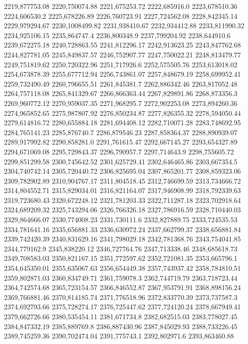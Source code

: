 2219,877753.08
2220,750074.88
2221,675253.72
2222,685916.0
2223,678510.36
2224,606530.2
2225,678226.89
2226,760723.91
2227,724562.08
2228,842345.14
2229,979294.67
2230,1008499.82
2231,938410.67
2232,934412.88
2233,811990.32
2234,925106.15
2235,864747.4
2236,800348.9
2237,799204.92
2238,644910.6
2239,672275.18
2240,728863.55
2241,812296.17
2242,913623.25
2243,847762.68
2244,827781.05
2245,849837.57
2246,752907.77
2247,750022.21
2248,813479.77
2249,751819.62
2250,720322.96
2251,717926.6
2252,575505.76
2253,613018.02
2254,673878.39
2255,677712.94
2256,743861.07
2257,848679.19
2258,699952.41
2259,732490.49
2260,796655.51
2261,845381.7
2262,886342.46
2263,817052.48
2264,757118.08
2265,841329.67
2266,866363.44
2267,829891.86
2268,873356.3
2269,960772.12
2270,959037.35
2271,968295.7
2272,902253.08
2273,894260.36
2274,965852.65
2275,987807.92
2276,850234.87
2277,826355.32
2278,594050.44
2279,614816.72
2280,655884.18
2281,694408.12
2282,710071.28
2283,748692.95
2284,765141.23
2285,876740.7
2286,879546.23
2287,858364.37
2288,890939.07
2289,917992.82
2290,858281.0
2291,761615.47
2292,667145.27
2293,654327.89
2294,671069.08
2295,729843.37
2296,790957.7
2297,714643.9
2298,755605.72
2299,851299.58
2300,745642.52
2301,625729.41
2302,646465.86
2303,667354.5
2304,740742.14
2305,720440.72
2306,825695.04
2307,865201.77
2308,859323.06
2309,782902.89
2310,904767.17
2311,804518.45
2312,746699.59
2313,734666.72
2314,804552.71
2315,829034.01
2316,821164.07
2317,946908.99
2318,792339.63
2319,723680.43
2320,672248.12
2321,781203.33
2322,711287.18
2323,702918.64
2324,689209.32
2325,743294.06
2326,766326.18
2327,786916.59
2328,710440.03
2329,864666.07
2330,774008.23
2331,730111.6
2332,827889.75
2333,724535.53
2334,781641.16
2335,656881.33
2336,630972.24
2337,662799.37
2338,656881.84
2339,742420.39
2340,831629.16
2341,798029.18
2342,781368.76
2343,754041.85
2344,779162.9
2345,838220.12
2346,727764.76
2347,713338.46
2348,685618.73
2349,708583.03
2350,821167.15
2351,772597.62
2352,721081.35
2353,665796.1
2354,645350.01
2355,635067.63
2356,654449.38
2357,743937.42
2358,784810.51
2359,802871.03
2360,834749.71
2361,759078.3
2362,744719.79
2363,718723.44
2364,742574.68
2365,723154.57
2366,846552.87
2367,953791.91
2368,898156.24
2369,766881.46
2370,814185.74
2371,776518.96
2372,833770.39
2373,737587.3
2374,692793.66
2375,728274.17
2376,725447.62
2377,724120.24
2378,667949.41
2379,662726.66
2380,535454.11
2381,671734.8
2382,682515.03
2383,778027.45
2384,847332.19
2385,889769.8
2386,887430.96
2387,845029.93
2388,733226.45
2389,745259.36
2390,702474.04
2391,775743.1
2392,802971.6
2393,863460.88
